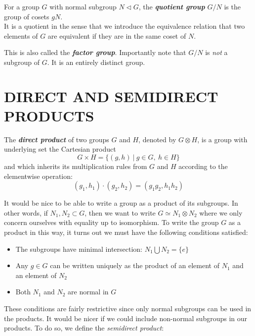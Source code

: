 \documentclass[9 pt]{report}
\begin{document}
\begin{tcolorbox}
	For a group $G$ with normal subgroup $N\triangleleft G$, the \textbf{\emph{quotient group}} $G/N$ is the group of cosets $gN$. 
	\\
	It is a quotient in the sense that we introduce the equivalence relation that two elements of $G$ are equivalent if they are in the same coset of $N$.
\end{tcolorbox}
This is also called the \textbf{\emph{factor group}}. Importantly note that $G/N$ is \emph{not} a subgroup of $G$. It is an entirely distinct group.


{\centering
\section*{DIRECT AND SEMIDIRECT PRODUCTS}}
\begin{tcolorbox}
	The \textbf{\emph{direct product}} of two groups $G$ and $H$, denoted by $G\otimes H$, is a group with underlying set the Cartesian product
	$$ G\times H = \{ (g, h) \:|\:g\in G , \:h\in H \} $$
	and which inherits its multiplication rules from $G$ and $H$ according to the elementwise operation:
	$$ (g_1, h_1)\cdot(g_2, h_2) = (g_1g_2, h_1h_2) $$
	
\end{tcolorbox}

It would be nice to be able to write a group as a product of its subgroups. In other words, if $N_1, N_2 \subset G$, then we want to write $G \simeq N_1\otimes N_2$ where we only concern ourselves with equality up to isomorphism. To write the group $G$ as a product in this way, it turns out we must have the following conditions satisfied:
\\
\begin{itemize}
		\item The subgroups have minimal intersection: $N_1 \bigcup N_2 = \{e\}$
		\item Any $g\in G$ can be written uniquely as the product of an element of $N_1$
		and an element of $N_2$
 		\item Both $N_1$ and $N_2$ are normal in $G$
\end{itemize}
These conditions are fairly restrictive since only normal subgroups can be used in the products. It would be nicer if we could include non-normal subgroups in our products. To do so, we define the \emph{semidirect product}:
\end{document}
